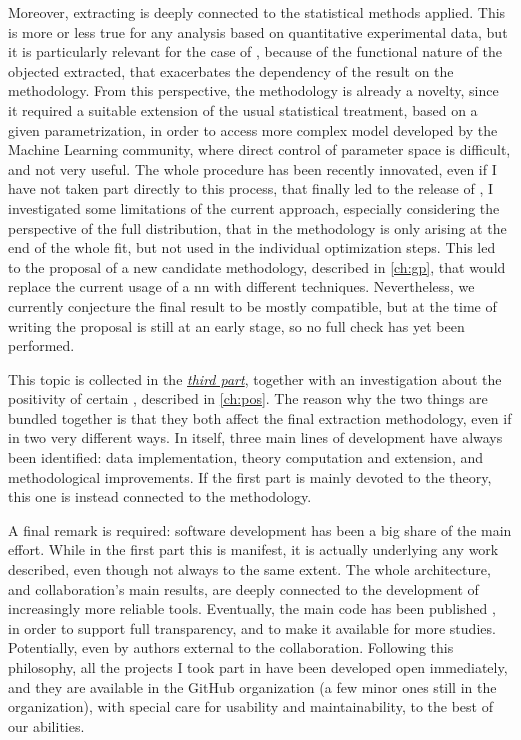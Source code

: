 Moreover, extracting \pdfs is deeply connected to the statistical methods
applied.
This is more or less true for any analysis based on quantitative experimental
data, but it is particularly relevant for the case of \pdfs, because of the
functional nature of the objected extracted, that exacerbates the dependency of
the result on the methodology.
From this perspective, the \nnpdf methodology is already a novelty, since it
required a suitable extension of the usual statistical treatment, based on a
given parametrization, in order to access more complex model developed by the
Machine Learning community, where direct control of parameter space is
difficult, and not very useful.
The whole procedure has been recently innovated, even if I have not taken part
directly to this process, that finally led to the release of 
\cite{NNPDF:2021njg}, I investigated some limitations of the current approach,
especially considering the perspective of the full distribution, that in the
\nnpdf methodology is only arising at the end of the whole fit, but not used in
the individual optimization steps.
This led to the proposal of a new candidate methodology, described in
\cref{ch:gp}, that would replace the current usage of a \acrfull{nn} with
different techniques.
Nevertheless, we currently conjecture the final result to be mostly compatible,
but at the time of writing the proposal is still at an early stage, so no full
check has yet been performed.

This topic is collected in the \hyperref[part:meth]{\textit{third part}},
together with an investigation about the positivity of certain \pdfs,
described in \cref{ch:pos}.
The reason why the two things are bundled together is that they both affect the
final extraction methodology, even if in two very different ways.
In \nnpdf itself, three main lines of development have always been identified:
data implementation, theory computation and extension, and methodological
improvements.
If the first part is  mainly devoted to the theory, this one is instead
connected to the methodology.

A final remark is required: software development has been a big share of the
main effort.
While in the first part this is manifest, it is actually underlying any work
described, even though not  always to the same extent.
The whole \nnpdf architecture, and collaboration's main results, are deeply
connected to the development of increasingly more reliable tools.
Eventually, the main code has been published \cite{NNPDF:2021uiq}, in order to
support full transparency, and to make it available for more studies.
Potentially, even by authors external to the collaboration.
Following this philosophy, all the projects I took part in have been developed
open immediately, and they are available in the  GitHub
organization (a few minor ones still in the  organization), with
special care for usability and maintainability, to the best of our abilities.
